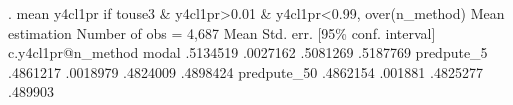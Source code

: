 . mean y4cl1pr if touse3 \& y4cl1pr>0.01 \& y4cl1pr<0.99, over(n_method)
{\smallskip}
Mean estimation                                Number of obs = 4,687
{\smallskip}
                   {\VBAR}       Mean   Std. err.     [95\% conf. interval]
c.y4cl1pr@n_method {\VBAR}
            modal  {\VBAR}   .5134519   .0027162      .5081269    .5187769
       predpute_5  {\VBAR}   .4861217   .0018979      .4824009    .4898424
      predpute_50  {\VBAR}   .4862154    .001881      .4825277     .489903
